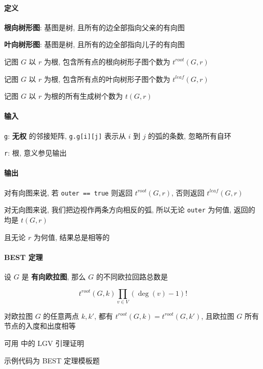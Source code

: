 \paragraph{定义}

\textbf{根向树形图}: 基图是树, 且所有的边全部指向父亲的有向图

\textbf{叶向树形图}: 基图是树, 且所有的边全部指向儿子的有向图

记图 \(G\) 以 \(r\) 为根, 包含所有点的根向树形子图个数为 \(t^{root}(G,r)\)

记图 \(G\) 以 \(r\) 为根, 包含所有点的叶向树形子图个数为 \(t^{leaf}(G,r)\)

记图 \(G\) 以 \(r\) 为根的所有生成树个数为 \(t(G,r)\)

\paragraph{输入}

\verb|g|: \textbf{无权} 的邻接矩阵, \verb|g.g[i][j]| 表示从 \(i\) 到 \(j\) 的弧的条数, 忽略所有自环

\verb|r|: 根, 意义参见输出

\paragraph{输出}

对有向图来说, 若 \verb|outer == true| 则返回 \(t^{root}(G,r)\), 否则返回 \(t^{leaf}(G,r)\)

对无向图来说, 我们把边视作两条方向相反的弧, 所以无论 \verb|outer| 为何值, 返回的均是 \(t(G,r)\)

且无论 \(r\) 为何值, 结果总是相等的

\paragraph{BEST 定理}

设 \(G\) 是 \textbf{有向欧拉图}, 那么 \(G\) 的不同欧拉回路总数是

\[
    t^{root}(G,k)\prod_{v\in V}(\deg (v) - 1)!
\]

对欧拉图 \(G\) 的任意两点 \(k, k'\), 都有 \(t^{root}(G,k)=t^{root}(G,k')\), 且欧拉图 \(G\) 所有节点的入度和出度相等

可用  中的 LGV 引理证明

示例代码为 BEST 定理模板题